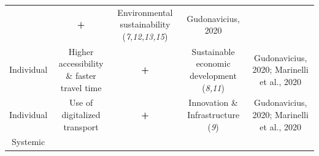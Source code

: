 \documentclass[
]{book}
\begin{document}
\begin{longtable}[]{@{}ccccc@{}}
\begin{minipage}[t]{0.16\columnwidth}
\end{minipage} & \begin{minipage}[t]{0.17\columnwidth}\centering
\textbf{+}\strut
\end{minipage} & \begin{minipage}[t]{0.17\columnwidth}\centering
Environmental sustainability (\emph{7,12,13,15})\strut
\end{minipage} & \begin{minipage}[t]{0.17\columnwidth}\centering
Gudonavicius, 2020\strut
\end{minipage}\tabularnewline
\begin{minipage}[t]{0.17\columnwidth}\centering
Individual\strut
\end{minipage} & \begin{minipage}[t]{0.16\columnwidth}\centering
Higher accessibility \& faster travel time\strut
\end{minipage} & \begin{minipage}[t]{0.17\columnwidth}\centering
\textbf{+}\strut
\end{minipage} & \begin{minipage}[t]{0.17\columnwidth}\centering
Sustainable economic development (\emph{8,11})\strut
\end{minipage} & \begin{minipage}[t]{0.17\columnwidth}\centering
Gudonavicius, 2020; Marinelli et al., 2020\strut
\end{minipage}\tabularnewline
\begin{minipage}[t]{0.17\columnwidth}\centering
Individual\strut
\end{minipage} & \begin{minipage}[t]{0.16\columnwidth}\centering
Use of digitalized transport\strut
\end{minipage} & \begin{minipage}[t]{0.17\columnwidth}\centering
\textbf{+}\strut
\end{minipage} & \begin{minipage}[t]{0.17\columnwidth}\centering
Innovation \& Infrastructure (\emph{9})\strut
\end{minipage} & \begin{minipage}[t]{0.17\columnwidth}\centering
Gudonavicius, 2020; Marinelli et al., 2020\strut
\end{minipage}\tabularnewline
\begin{minipage}[t]{0.17\columnwidth}\centering
Systemic\strut
\end{minipage} & \begin{minipage}[t]{0.16\columnwidth}\centering

\end{minipage}
\end{longtable}
\end{document}
